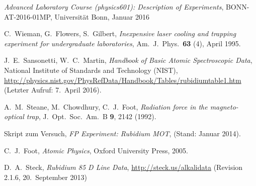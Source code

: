 \documentclass[11pt, a4paper]{article}
\numberwithin{equation}{section}
\begin{document}
\FloatBarrier
\vspace{\fill}
\begin{thebibliography}{19}
	\emph{Advanced Laboratory Course (physics601): Description of Experiments}, BONN-AT-2016-01MP, Universität Bonn, Januar 2016

	C.\ Wieman, G.\ Flowers, S.\ Gilbert,
	\emph{Inexpensive laser cooling and trapping experiment for undergraduate laboratories},
	Am.\ J.\ Phys.\ \textbf{63} (4), April 1995.

	J.\ E.\ Sansonetti, W.\ C.\ Martin,
	\emph{Handbook of Basic Atomic Spectroscopic Data},
	National Institute of Standards and Technology (NIST), \url{http://physics.nist.gov/PhysRefData/Handbook/Tables/rubidiumtable1.htm} (Letzter Aufruf: 7.\ April 2016).

	A.\ M.\ Steane, M.\ Chowdhury, C.\ J.\ Foot,
	\emph{Radiation force in the magneto-optical trap},
	J.\ Opt.\ Soc.\ Am.\ B \textbf{9}, 2142 (1992).

	Skript zum Versuch,
	\emph{FP Experiment: Rubidium MOT},
	(Stand: Januar 2014).

	C.\ J.\ Foot,
	\emph{Atomic Physics},
	Oxford University Press, 2005.
	
	D.\ A.\ Steck,
	\emph{Rubidium 85 D Line Data},
	\url{http://steck.us/alkalidata} (Revision 2.1.6, 20.\ September 2013)
\end{thebibliography}

\end{document}
